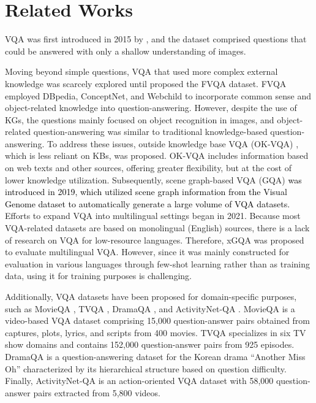 \documentclass[letterpaper]{article} %
\newcommand{\kt}[1]{\textcolor{black}{#1}}
\begin{document}
\section{Related Works}\label{sec:related-work}
VQA was first introduced in 2015 by \citeauthor{antol2015vqa}, and the dataset comprised questions that could be answered with only a shallow understanding of images.

Moving beyond simple questions, VQA that used more complex external knowledge was scarcely explored until \citeauthor{wang2017fvqa} proposed the FVQA dataset. FVQA employed DBpedia, ConceptNet, and Webchild to incorporate common sense and object-related knowledge into question-answering. However, despite the use of KGs, the questions mainly focused on object recognition in images, and object-related question-answering was similar to traditional knowledge-based question-answering. To address these issues, outside knowledge base VQA (OK-VQA) \cite{schwenk2022okvqa}, which is less reliant on KBs, was proposed. OK-VQA includes information based on web texts and other sources, offering greater flexibility, but at the cost of lower knowledge utilization. Subsequently, scene graph-based VQA (GQA) \kt{\cite{hudson2019gqa} was introduced in 2019, which utilized scene graph information from the Visual Genome dataset \cite{visualgenome} to automatically generate a large volume of VQA datasets.} %
Efforts to expand VQA into multilingual settings began in 2021. Because most VQA-related datasets are based on monolingual (English) sources, there is a lack of research on VQA for low-resource languages. Therefore, xGQA was proposed to evaluate multilingual VQA. However, since it was mainly constructed for evaluation in various languages through few-shot learning rather than as training data, using it for training purposes is challenging.

Additionally, VQA datasets have been proposed for domain-specific purposes, such as MovieQA \cite{tapaswi2016movieqa}, TVQA \cite{lei2018tvqa}, DramaQA \cite{choi2021dramaqa}, and ActivityNet-QA \cite{yu2019activitynet}. MovieQA is a video-based VQA dataset comprising 15,000 question-answer pairs obtained from captures, plots, lyrics, and scripts from 400 movies. TVQA specializes in six TV show domains and contains 152,000 question-answer pairs from 925 episodes. DramaQA is a question-answering dataset for the Korean drama ``Another Miss Oh'' characterized by its hierarchical structure based on question difficulty. Finally, ActivityNet-QA is an action-oriented VQA dataset with 58,000 question-answer pairs extracted from 5,800 videos.
\end{document}
